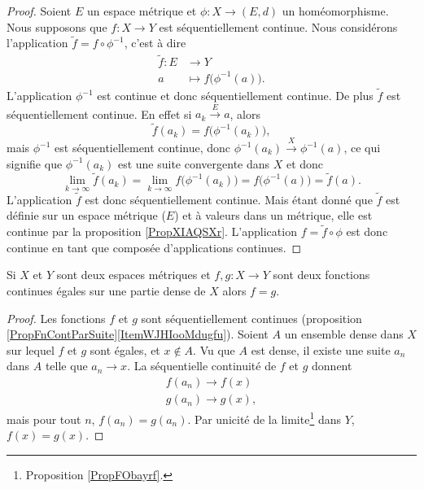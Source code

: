 \begin{proof}
    Soient \( E\) un espace métrique et \( \phi\colon X\to (E,d)\) un homéomorphisme. Nous supposons que \( f\colon X\to Y\) est séquentiellement continue. Nous considérons l'application \( \tilde f=f\circ\phi^{-1}\), c'est à dire
    \begin{equation}
        \begin{aligned}
            \tilde f\colon E&\to Y \\
            a&\mapsto f\big( \phi^{-1}(a) \big). 
        \end{aligned}
    \end{equation}
    L'application \( \phi^{-1}\) est continue et donc séquentiellement continue. De plus \( \tilde f\) est séquentiellement continue. En effet si \( a_k\stackrel{E}{\longrightarrow}a\), alors
    \begin{equation}
        \tilde f(a_k)=f\big( \phi^{-1}(a_k) \big),
    \end{equation}
    mais \( \phi^{-1}\) est séquentiellement continue, donc \( \phi^{-1}(a_k)\stackrel{X}{\longrightarrow}\phi^{-1}(a)\), ce qui signifie que \( \phi^{-1}(a_k)\) est une suite convergente dans \( X\) et donc
    \begin{equation}
        \lim_{k\to \infty} \tilde f(a_k)=\lim_{k\to \infty} f\big( \phi^{-1}(a_k) \big)=f\big( \phi^{-1}(a) \big)=\tilde f(a).
    \end{equation}
    L'application \( \tilde f\) est donc séquentiellement continue. Mais étant donné que \( \tilde f\) est définie sur un espace métrique (\( E\)) et à valeurs dans un métrique, elle est continue par la proposition \ref{PropXIAQSXr}. L'application \( f=\tilde f\circ\phi\) est donc continue en tant que composée d'applications continues.
\end{proof}

\begin{proposition} \label{PropCJGIooZNpnGF}
    Si \( X\) et \( Y\) sont deux espaces métriques et \( f,g\colon X\to Y\) sont deux fonctions continues égales sur une partie dense de \( X\) alors \( f=g\).
\end{proposition}

\begin{proof}
    Les fonctions \( f\) et \( g\) sont séquentiellement continues (proposition \ref{PropFnContParSuite}\ref{ItemWJHIooMdugfu}). Soient \( A\) un ensemble dense dans \( X\) sur lequel \( f\) et \( g\) sont égales, et \( x\notin A\). Vu que \( A\) est dense, il existe une suite \( a_n\) dans \( A\) telle que \( a_n\to x\). La séquentielle continuité de \( f\) et \( g\) donnent
    \begin{subequations}
        \begin{align}
            f(a_n)\to f(x)\\
            g(a_n)\to g(x),
        \end{align}
    \end{subequations}
    mais pour tout \( n\), \( f(a_n)=g(a_n)\). Par unicité de la limite\footnote{Proposition \ref{PropFObayrf}.} dans \( Y\), \( f(x)=g(x)\).
\end{proof}

